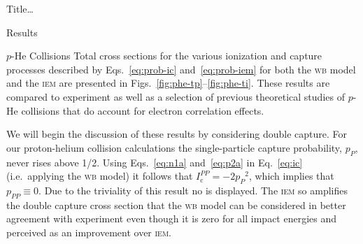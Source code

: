\documentclass[letterpaper, 11 pt]{report}
\begin{document}
\begin{chapter}{ Title\dots \label{chap:p-he2p-he}}
\begin{section}{Results \label{sec:phe2p-res}}
\begin{subsection}{\texorpdfstring{$p$}{p}-He Collisions \label{sec:phe-res}}
         Total cross sections for the various ionization and capture processes described by
         Eqs.~\eqref{eq:prob-ic} and~\eqref{eq:prob-iem} for both the \textsc{wb} model and the
         \textsc{iem} are presented in Figs.~\ref{fig:phe-tp}--\ref{fig:phe-ti}. These results are
         compared to experiment as well as a selection of previous theoretical studies of $p$-He
         collisions that do account for electron correlation effects.

         We will begin the discussion of these results by considering double capture. For our
         proton-helium collision calculations the single-particle capture probability, $p_P$, never
         rises above 1/2. Using Eqs.~\eqref{eq:n1a} and~\eqref{eq:p2a} in Eq.~\eqref{eq:ic} (i.e.\
         applying the \textsc{wb} model) it follows that $I^{PP}_\mathrm{c} = -2 {p_P}^2$, which implies
         that $p_{PP} \equiv 0$. Due to the triviality of this result no is displayed. The \textsc{iem}
         so amplifies the double capture cross section that the \textsc{wb} model can be considered in
         better agreement with experiment even though it is zero for all impact energies and perceived
         as an improvement over \textsc{iem}.


\end{subsection}
\end{section}
\end{chapter}
\end{document}
